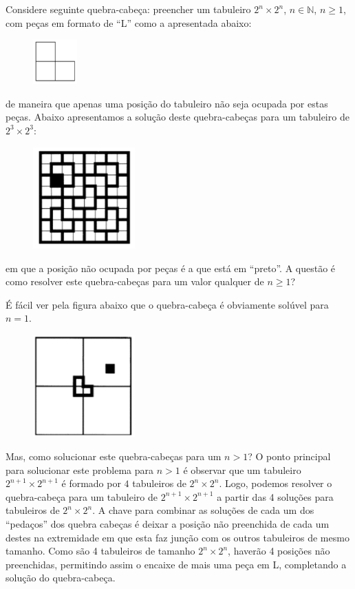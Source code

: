 Considere seguinte quebra-cabeça: preencher um tabuleiro $2^n \times 2^n$, $n
\in \mathbb{N}$, $n\geq 1$, com peças em formato de ``L'' como a
apresentada abaixo:
\begin{figure}[H]
  \centering
      \includegraphics[width=0.15\textwidth]{imagens/tromino.png}
 \end{figure}
de maneira que apenas uma posição do tabuleiro não seja ocupada por
estas peças. Abaixo apresentamos a solução deste quebra-cabeças para
um tabuleiro de $2^3\times 2^3$:
\begin{figure}[H]
  \centering
      \includegraphics[width=0.35\textwidth]{imagens/tab5.png}
 \end{figure}
em que a posição não ocupada por peças é a que está em ``preto''. A
questão é como resolver este quebra-cabeças para um valor qualquer de
$n \geq 1$?

É fácil ver pela figura abaixo que o quebra-cabeça é obviamente
solúvel para $n = 1$.
\begin{figure}[H]
  \centering
      \includegraphics[width=0.35\textwidth]{imagens/tab1.png}
 \end{figure}
Mas, como solucionar este quebra-cabeças para um $n > 1$? O ponto
principal para solucionar este problema para $n > 1$ é observar que um
tabuleiro $2^{n + 1} \times 2^{n + 1}$ é formado por $4$ tabuleiros de
$2^n\times 2^n$. Logo, podemos resolver o quebra-cabeça para um
tabuleiro de $2^{n + 1} \times 2^{n + 1}$ a partir das 4 soluções para
tabuleiros de $2^n\times 2^n$. A chave para combinar as soluções de
cada um dos ``pedaços'' dos quebra cabeças é deixar a posição não
preenchida de cada um destes na extremidade em que esta faz junção
com os outros tabuleiros de mesmo tamanho. Como são 4 tabuleiros de
tamanho $2^n\times 2^n$, haverão 4 posições não preenchidas,
permitindo assim o encaixe de mais uma peça em L, completando a
solução do quebra-cabeça.

